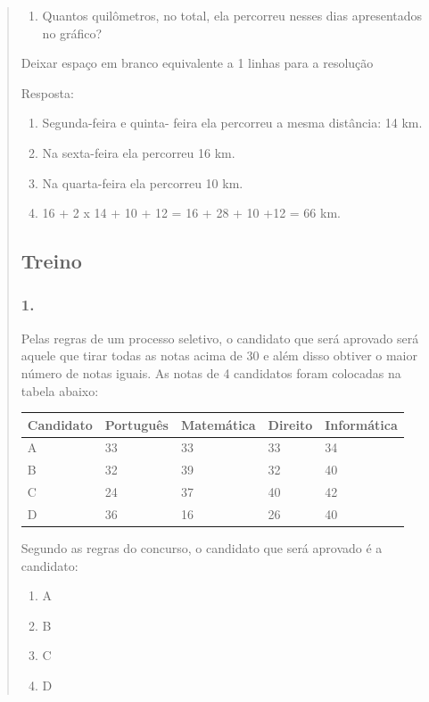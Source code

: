 \begin{enumerate}
\begin{escolha}
\begin{enumerate}
\begin{itemize}
\begin{itemize}
\begin{escolha}
\begin{quote}
\begin{escolha}
{\begin{enumerate}
\def\labelenumi{\alph{enumi})}
\item
  Quantos quilômetros, no total, ela percorreu nesses dias apresentados
  no gráfico?
\end{enumerate}

Deixar espaço em branco equivalente a 1 linhas para a resolução

Resposta:

\begin{enumerate}
\def\labelenumi{\alph{enumi})}
\item
  Segunda-feira e quinta- feira ela percorreu a mesma distância: 14 km.
\item
  Na sexta-feira ela percorreu 16 km.
\item
  Na quarta-feira ela percorreu 10 km.
\item
  16 + 2 x 14 + 10 + 12 = 16 + 28 + 10 +12 = 66 km.
\end{enumerate}

\subsection{Treino}\label{treino-7}

\subsubsection{1.}\label{section-101}

Pelas regras de um processo seletivo, o candidato que será aprovado será
aquele que tirar todas as notas acima de 30 e além disso obtiver o maior
número de notas iguais. As notas de 4 candidatos foram colocadas na
tabela abaixo:

\begin{longtable}[]{@{}lllll@{}}
\toprule
Candidato & Português & Matemática & Direito &
Informática\tabularnewline
\midrule
\endhead
A & 33 & 33 & 33 & 34\tabularnewline
B & 32 & 39 & 32 & 40\tabularnewline
C & 24 & 37 & 40 & 42\tabularnewline
D & 36 & 16 & 26 & 40\tabularnewline
\bottomrule
\end{longtable}

Segundo as regras do concurso, o candidato que será aprovado é a
candidato:

\begin{enumerate}
\def\labelenumi{\alph{enumi})}
\item
  A
\item
  B
\item
  C
\item
  D
\end{enumerate}

}
\end{escolha}
\end{quote}
\end{escolha}
\end{itemize}
\end{itemize}
\end{enumerate}
\end{escolha}
\end{enumerate}
